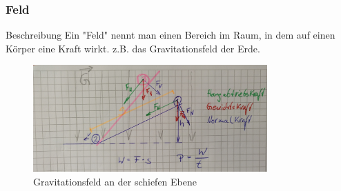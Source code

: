 \documentclass[12pt,oneside]{scrartcl}
\begin{document}
\frame
{
  \frametitle{Feld}
\begin{block}{Beschreibung}
Ein "Feld" nennt man einen Bereich im Raum, in dem auf einen Körper eine Kraft wirkt. z.B. das Gravitationsfeld der Erde.
\end{block}
      \begin{figure}
	  \includegraphics[width=0.8\textwidth]{Feld}
	  \vspace{-3mm}
	  \caption{Gravitationsfeld an der schiefen Ebene}
   \end{figure}
}
\end{document}
